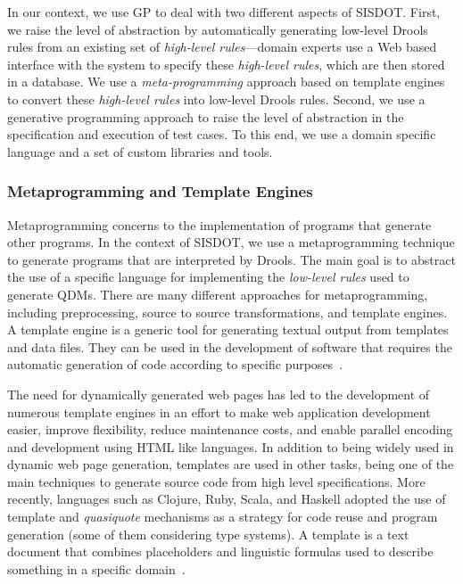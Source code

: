 \documentclass[AMA,STIX1COL,hidelinks]{WileyNJD-v2}
\newcommand{\callers}{\emph{high-level rules}\xspace}
\begin{document}
In our context, we use GP to deal with two different aspects of SISDOT. First, we raise the level of abstraction by automatically generating low-level Drools rules from an existing set of \callers{\color{blue}---domain experts use a Web based interface with the system to specify these \callers, which are then stored in a database.} We use a \emph{meta-programming} approach based on template engines to convert these \callers into low-level Drools rules. Second, we use a generative programming approach to raise the level of abstraction in the specification and execution of test cases. To this end, we use a domain specific language and a set of
custom libraries and tools.  


\subsubsection{Metaprogramming and Template Engines}

Metaprogramming concerns to the implementation of programs that generate other programs. In the context of SISDOT, we use a metaprogramming technique to generate programs that are interpreted by Drools. The main goal is to abstract the use of a specific language for implementing the \emph{low-level rules} used to generate QDMs. There are many different approaches for metaprogramming, including preprocessing, source to source transformations, and template engines. A template engine is a generic tool for generating textual output from templates and data files. They can be used in the development of software that requires the automatic generation of code according to specific purposes~\cite{benato2017}. 

The need for dynamically generated web pages has led to the development of numerous template engines in an effort to make web application development easier, improve flexibility, reduce maintenance costs, and enable parallel encoding and development using HTML like languages. In addition to being widely used in dynamic web page generation, templates are used in other tasks, being one of the main techniques to generate source code from high level specifications. More recently, languages such as Clojure, Ruby, Scala, and Haskell adopted the use of template and \emph{quasiquote} mechanisms as a strategy for code reuse and program generation (some of them considering type systems). A template is a text document that combines placeholders and linguistic formulas used to describe something in a specific domain~\cite{segura2017}. 
\end{document}
